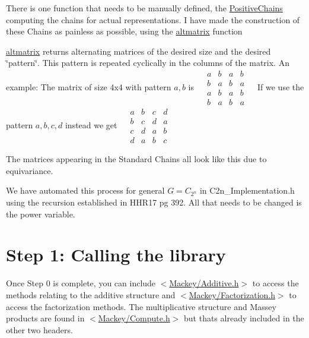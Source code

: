 \begin{DoxyItemize}
\item There is one function that needs to be manually defined, the \hyperlink{classGroupSpecific_1_1Function_a6d247b31d297f733e9cd6f68921a37cd}{Positive\+Chains} computing the chains for actual representations. I have made the construction of these Chains as painless as possible, using the \hyperlink{namespaceMackey_a26a529f63caac9c5b4dc809e0e5831be}{altmatrix} function
\item \hyperlink{namespaceMackey_a26a529f63caac9c5b4dc809e0e5831be}{altmatrix} returns alternating matrices of the desired size and the desired \char`\"{}pattern\char`\"{}. This pattern is repeated cyclically in the columns of the matrix. An example\+: The matrix of size 4x4 with pattern $a,b$ is ~\newline
 $\begin{matrix} a&b&a&b\\ b&a&b&a\\ a&b&a&b \\ b&a&b&a \end{matrix}$ ~\newline
 If we use the pattern $a,b,c,d$ instead we get ~\newline
 $\begin{matrix} a&b&c&d\\ b&c&d&a\\ c&d&a&b \\ d&a&b&c \end{matrix}$ ~\newline

\item The matrices appearing in the Standard Chains all look like this due to equivariance.
\end{DoxyItemize}

We have automated this process for general $G=C_{2^n}$ in {\ttfamily C2n\+\_\+\+Implementation.\+h} using the recursion established in H\+H\+R17 pg 392. All that needs to be changed is the power variable.\hypertarget{use_next}{}\section{Step 1\+: Calling the library}\label{use_next}
Once Step 0 is complete, you can include {\ttfamily $<$\hyperlink{Additive_8h}{Mackey/\+Additive.\+h}$>$} to access the methods relating to the additive structure and {\ttfamily $<$\hyperlink{Factorization_8h}{Mackey/\+Factorization.\+h}$>$} to access the factorization methods. The multiplicative structure and Massey products are found in {\ttfamily $<$\hyperlink{Compute_8h}{Mackey/\+Compute.\+h}$>$} but that\textquotesingle{}s already included in the other two headers.

